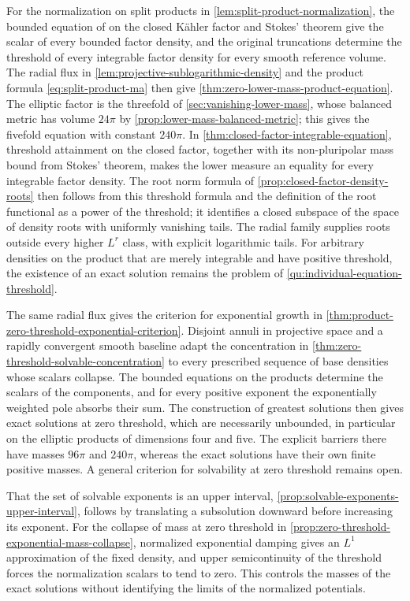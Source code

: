For the normalization on split products in \cref{lem:split-product-normalization}, the bounded equation of \cite[Theorem~0.1, p.~141]{KN15} on the closed K\"ahler factor and Stokes' theorem give the scalar of every bounded factor density, and the original truncations determine the threshold of every integrable factor density for every smooth reference volume. The radial flux in \cref{lem:projective-sublogarithmic-density} and the product formula \eqref{eq:split-product-ma} then give \cref{thm:zero-lower-mass-product-equation}. The elliptic factor is the threefold of \cref{sec:vanishing-lower-mass}, whose balanced metric has volume $24\pi$ by \cref{prop:lower-mass-balanced-metric}; this gives the fivefold equation with constant $240\pi$. In \cref{thm:closed-factor-integrable-equation}, threshold attainment on the closed factor, together with its non-pluripolar mass bound from Stokes' theorem, makes the lower measure an equality for every integrable factor density. The root norm formula of \cref{prop:closed-factor-density-roots} then follows from this threshold formula and the definition of the root functional as a power of the threshold; it identifies a closed subspace of the space of density roots with uniformly vanishing tails. The radial family supplies roots outside every higher $L^r$ class, with explicit logarithmic tails. For arbitrary densities on the product that are merely integrable and have positive threshold, the existence of an exact solution remains the problem of \cref{qu:individual-equation-threshold}.

The same radial flux gives the criterion for exponential growth in \cref{thm:product-zero-threshold-exponential-criterion}. Disjoint annuli in projective space and a rapidly convergent smooth baseline adapt the concentration in \cref{thm:zero-threshold-solvable-concentration} to every prescribed sequence of base densities whose scalars collapse. The bounded equations on the products determine the scalars of the components, and for every positive exponent the exponentially weighted pole absorbs their sum. The construction of greatest solutions then gives exact solutions at zero threshold, which are necessarily unbounded, in particular on the elliptic products of dimensions four and five. The explicit barriers there have masses $96\pi$ and $240\pi$, whereas the exact solutions have their own finite positive masses. A general criterion for solvability at zero threshold remains open.

That the set of solvable exponents is an upper interval, \cref{prop:solvable-exponents-upper-interval}, follows by translating a subsolution downward before increasing its exponent. For the collapse of mass at zero threshold in \cref{prop:zero-threshold-exponential-mass-collapse}, normalized exponential damping gives an $L^1$ approximation of the fixed density, and upper semicontinuity of the threshold forces the normalization scalars to tend to zero. This controls the masses of the exact solutions without identifying the limits of the normalized potentials.

